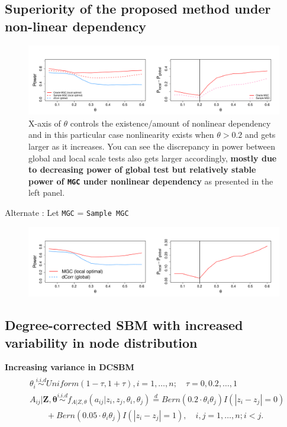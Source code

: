 \documentclass[12pt]{article}
\begin{document}
\subsection*{Superiority of the proposed method under non-linear dependency}

\begin{figure}[h]
	\centering
	\includegraphics[width=\linewidth]{../Figure/powerplot.pdf}
	\caption{X-axis of $\theta$ controls the existence/amount of nonlinear dependency and in this particular case nonlinearity exists when $\theta > 0.2$ and gets larger as it increases. You can see the discrepancy in power between global and local scale tests also gets larger accordingly, \textbf{mostly due to decreasing power of global test but relatively stable power of \texttt{MGC} under nonlinear dependency} as presented in the left panel.}
	\label{fig:powerplot}
\end{figure}

Alternate : Let \texttt{MGC} = \texttt{Sample MGC}

\begin{figure}[H]
	\centering
	\includegraphics[width=\linewidth]{../Figure/powerplot_simple.pdf}
\end{figure}

\newpage
\subsection*{Degree-corrected SBM with increased variability in node distribution}	

\textbf{Increasing variance in DCSBM}
\begin{equation}
\label{eq:dcVariance}
\begin{gathered}
\begin{aligned}
& \theta_{i} \overset{i.i.d}{\sim} Uniform(1 - \tau, 1 + \tau), i = 1, \ldots, n; \quad \tau = 0, 0.2, \ldots, 1\\ 
& A_{ij} | \mathbf{Z}, \mathbf{\theta}   \overset{i.i.d}{\sim}   f_{A|Z, \theta}(a_{ij} | z_{i}, z_{j}, \theta_{i}, \theta_{j}) \stackrel{d}{=} Bern(0.2 \cdot \theta_{i}\theta_{j}) I ( |z_{i} - z_{j}| = 0 ) \\ & \quad \quad + Bern(0.05 \cdot \theta_{i} \theta_{j} ) I(|z_{i} - z_{j}| = 1), \quad i,j=1, \ldots, n; i < j. 
\end{aligned}
\end{gathered}
\end{equation}
\end{document}
